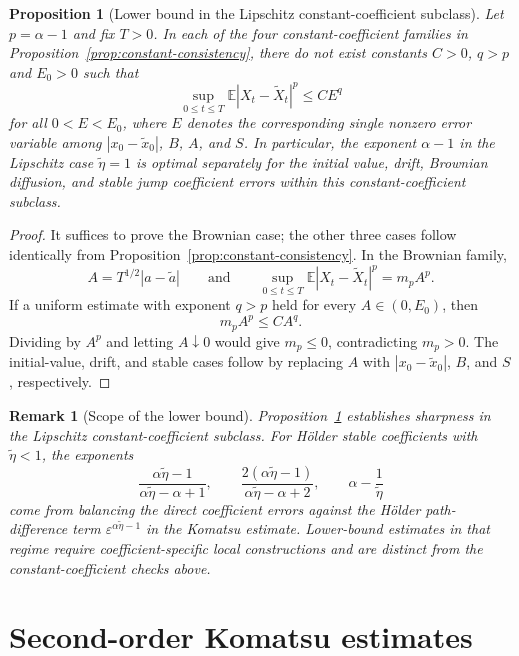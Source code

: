 \documentclass[10pt,a4paper]{amsart}
\newtheorem{proposition}[theorem]{Proposition}
\newtheorem{remark}[theorem]{Remark}
\newcommand{\E}{\mathbb{E}}
\newcommand{\1}{\mathbf{1}}
\newcommand{\wt}{\tilde}
\newcommand{\eps}{\varepsilon}
\begin{document}
\begin{proposition}[Lower bound in the Lipschitz constant-coefficient subclass]
\label{prop:constant-sharpness}
Let $p=\alpha-1$ and fix $T>0$. In each of the four constant-coefficient families in Proposition~\ref{prop:constant-consistency}, there do not exist constants $C>0$, $q>p$ and $E_0>0$ such that
\[
  \sup_{0\le t\le T}\E|X_t-\wt X_t|^p\le C E^q
\]
for all $0<E<E_0$, where $E$ denotes the corresponding single nonzero error variable among $|x_0-\wt x_0|$, $B$, $A$, and $S$. In particular, the exponent $\alpha-1$ in the Lipschitz case $\wt\eta=1$ is optimal separately for the initial value, drift, Brownian diffusion, and stable jump coefficient errors within this constant-coefficient subclass.
\end{proposition}

\begin{proof}
It suffices to prove the Brownian case; the other three cases follow identically from Proposition~\ref{prop:constant-consistency}. In the Brownian family,
\[
  A=T^{1/2}|a-\wt a|
  \qquad\text{and}\qquad
  \sup_{0\le t\le T}\E|X_t-\wt X_t|^p=m_pA^p.
\]
If a uniform estimate with exponent $q>p$ held for every $A\in(0,E_0)$, then
\[
  m_pA^p\le CA^q.
\]
Dividing by $A^p$ and letting $A\downarrow0$ would give $m_p\le0$, contradicting $m_p>0$. The initial-value, drift, and stable cases follow by replacing $A$ with $|x_0-\wt x_0|$, $B$, and $S$, respectively.
\end{proof}

\begin{remark}[Scope of the lower bound]
Proposition~\ref{prop:constant-sharpness} establishes sharpness in the Lipschitz constant-coefficient subclass. For H\"older stable coefficients with $\wt\eta<1$, the exponents
\[
\frac{\alpha\wt\eta-1}{\alpha\wt\eta-\alpha+1},
\qquad
\frac{2(\alpha\wt\eta-1)}{\alpha\wt\eta-\alpha+2},
\qquad
\alpha-\frac1{\wt\eta}
\]
come from balancing the direct coefficient errors against the H\"older path-difference term $\eps^{\alpha\wt\eta-1}$ in the Komatsu estimate. Lower-bound estimates in that regime require coefficient-specific local constructions and are distinct from the constant-coefficient checks above.
\end{remark}

\section{Second-order Komatsu estimates}
\label{sec:auxiliary}
\end{document}
